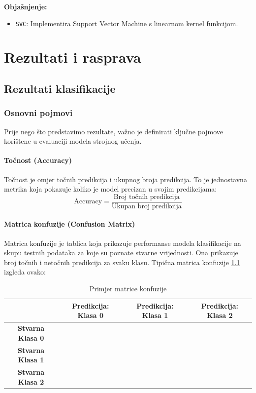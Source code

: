 \documentclass[zavrsnirad]{fer}
\begin{document}
\noindent \textbf{Objašnjenje:}
\begin{itemize}
	\item \texttt{SVC}: Implementira Support Vector Machine s linearnom kernel funkcijom.
\end{itemize}


\chapter{Rezultati i rasprava}
\label{pog:rezultati_i_rasprava}

\section{Rezultati klasifikacije}

\subsection{Osnovni pojmovi}

Prije nego što predstavimo rezultate, važno je definirati ključne pojmove korištene u evaluaciji modela strojnog učenja.

\subsubsection{Točnost (Accuracy)}

Točnost je omjer točnih predikcija i ukupnog broja predikcija. To je jednostavna metrika koja pokazuje koliko je model precizan u svojim predikcijama:
\begin{equation}
	\text{Accuracy} = \frac{\text{Broj točnih predikcija}}{\text{Ukupan broj predikcija}}
\end{equation}

\subsubsection{Matrica konfuzije (Confusion Matrix)}

Matrica konfuzije je tablica koja prikazuje performanse modela klasifikacije na skupu testnih podataka za koje su poznate stvarne vrijednosti. Ona prikazuje broj točnih i netočnih predikcija za svaku klasu. Tipična matrica konfuzije \ref{tab:conf_matrix} izgleda ovako:

\begin{table}[h]
	\centering
	\begin{tabular}{c|c|c|c}
		& \textbf{Predikcija: Klasa 0} & \textbf{Predikcija: Klasa 1} & \textbf{Predikcija: Klasa 2} \\ \hline
		\textbf{Stvarna Klasa 0} & \cellcolor{green!25} & & \\ \hline
		\textbf{Stvarna Klasa 1} & & \cellcolor{green!25} & \\ \hline
		\textbf{Stvarna Klasa 2} & & & \cellcolor{green!25} \\ 
	\end{tabular}
	\caption{Primjer matrice konfuzije}
	\label{tab:conf_matrix}
\end{table}
\end{document}
